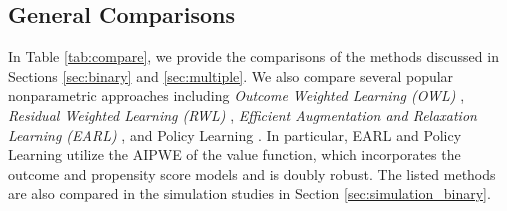 \documentclass[11pt]{article}
\theoremstyle{definition}
\theoremstyle{remark}
\begin{document}
\subsection{General Comparisons}\label{sec:compare}

In Table \ref{tab:compare}, we provide the comparisons of the methods discussed in Sections \ref{sec:binary} and \ref{sec:multiple}. We also compare several popular nonparametric approaches including \textit{Outcome Weighted Learning (OWL)} \citep{zhao2012estimating}, \textit{Residual Weighted Learning (RWL)} \citep{zhou2017residual,liu2018augmented}, \textit{Efficient Augmentation and Relaxation Learning (EARL)} \citep{zhao2019efficient}, and Policy Learning \citep{athey2021policy,zhou2018offline}. In particular, EARL and Policy Learning utilize the AIPWE of the value function, which incorporates the outcome and propensity score models and is doubly robust. The listed methods are also compared in the simulation studies in Section \ref{sec:simulation_binary}.
\end{document}
